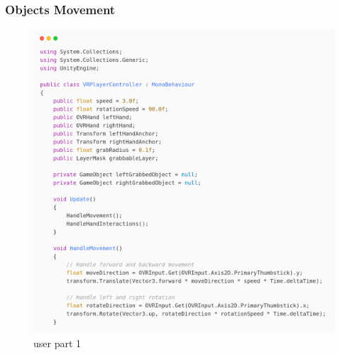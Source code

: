 \subsubsection{Objects Movement}
\begin{figure}[h]
	\centering
	\includegraphics[width=1\textwidth, height=0.7\textheight]{Images/playerp1.png}
	\caption{user part 1}
	\label{fig:Grabbing-Tool}
\end{figure}
\newpage
